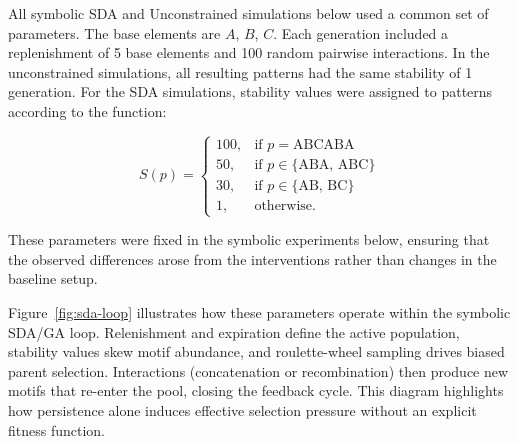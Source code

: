 \documentclass[life,article,submit,pdftex,moreauthors]{Definitions/mdpi}
\begin{document}
All symbolic SDA and Unconstrained simulations below used a common set of parameters. The base elements are $A$, $B$, $C$.
Each generation included
a replenishment of 5 base elements and 100 random pairwise
interactions. In the unconstrained simulations, all resulting patterns had the same stability of 1 generation. For the SDA simulations, 
stability values were assigned to patterns according to the
function:

\begin{equation}
S(p) =
\begin{cases}
100, & \text{if } p = \text{ABCABA} \\
50, & \text{if } p \in \{\text{ABA, ABC}\} \\
30, & \text{if } p \in \{\text{AB, BC}\} \\
1, & \text{otherwise}.
\end{cases}
\end{equation}

These parameters were fixed in the symbolic experiments below, ensuring that the observed differences arose from the interventions rather than changes in
the baseline setup.

Figure~\ref{fig:sda-loop} illustrates how these parameters operate within the
symbolic SDA/GA loop. Relenishment and expiration define the active population, 
stability values skew motif abundance, and roulette-wheel sampling drives
biased parent selection. Interactions (concatenation or recombination) then
produce new motifs that re-enter the pool, closing the feedback cycle. 
This diagram highlights how persistence alone induces effective selection
pressure without an explicit fitness function.
\end{document}
